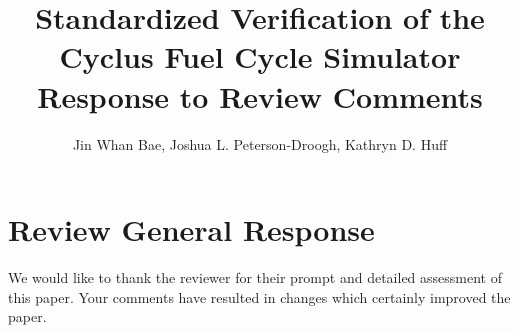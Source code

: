 \documentclass[answers,11pt]{exam}
\begin{document}


%


\title{Standardized Verification of the Cyclus Fuel Cycle Simulator\\
        \large Response to Review Comments}
\author{Jin Whan Bae, Joshua L. Peterson-Droogh, Kathryn D. Huff}



%
\maketitle
\section*{Review General Response}
We would like to thank the reviewer for their prompt and detailed assessment of 
this paper. Your comments have resulted in changes which certainly improved the 
paper.
\end{document}
